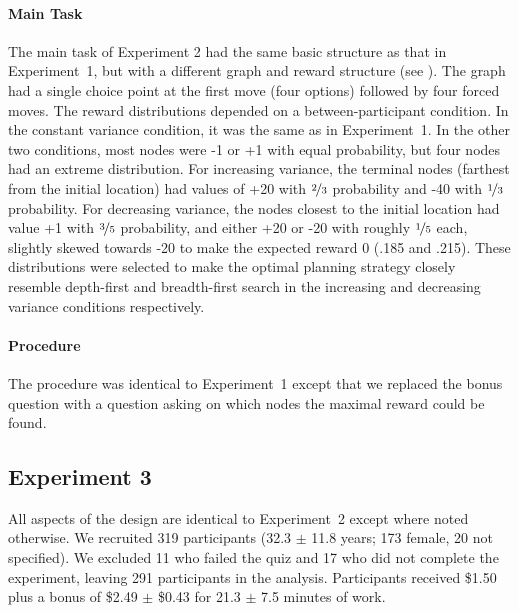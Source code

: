 \paragraph{Main Task}
The main task of Experiment 2 had the same basic structure as that in Experiment~1, but with a different graph and reward structure (see ). The graph had a single choice point at the first move (four options) followed by four forced moves. The reward distributions depended on a between-participant condition. In the constant variance condition, it was the same as in Experiment~1. In the other two conditions, most nodes were -1 or +1 with equal probability, but four nodes had an extreme distribution. For increasing variance, the terminal nodes (farthest from the initial location) had values of +20 with $\nicefrac{2}{3}$ probability and -40 with $\nicefrac{1}{3}$ probability. For decreasing variance, the nodes closest to the initial location had value +1 with $\nicefrac{3}{5}$ probability, and either +20 or -20 with roughly $\nicefrac{1}{5}$ each, slightly skewed towards -20 to make the expected reward 0 (.185 and .215). These distributions were selected to make the optimal planning strategy closely resemble depth-first and breadth-first search in the increasing and decreasing variance conditions respectively.

\paragraph{Procedure}
The procedure was identical to Experiment~1 except that we replaced the bonus question with a question asking on which nodes the maximal reward could be found.


\subsection{Experiment 3}\label{sec:planning-methods3}
All aspects of the design are identical to Experiment~2 except where noted otherwise. We recruited 319 participants (32.3 $\pm$ 11.8 years; 173 female, 20 not specified). We excluded 11 who failed the quiz and 17 who did not complete the experiment, leaving 291 participants in the analysis. Participants received \$1.50 plus a bonus of \$2.49 $\pm$ \$0.43 for 21.3 $\pm$ 7.5 minutes of work.

